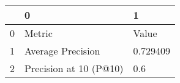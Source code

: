 \begin{tabular}{lll}
\toprule
{} &                       0 &         1 \\
\midrule
0 &                  Metric &     Value \\
1 &       Average Precision &  0.729409 \\
2 &  Precision at 10 (P@10) &       0.6 \\
\bottomrule
\end{tabular}
